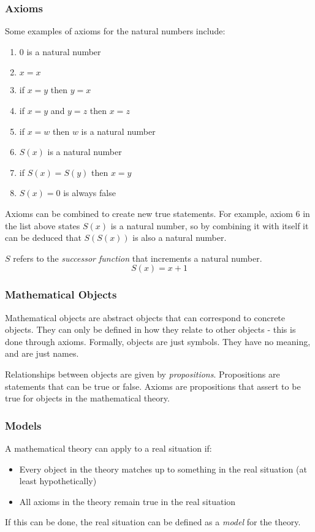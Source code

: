 \documentclass{article}
\begin{document}
\subsubsection{Axioms}
Some examples of axioms for the natural numbers include:
\begin{enumerate}
    \item 0 is a natural number
    \item \(x = x\)
    \item if \(x = y\) then \(y = x\)
    \item if \(x = y\) and \(y = z\) then \(x = z\)
    \item if \(x = w\) then \(w\) is a natural number
    \item \(S(x)\) is a natural number
    \item if \(S(x) = S(y)\) then \(x = y\)
    \item \(S(x) = 0\) is always false
\end{enumerate}
Axioms can be combined to create new true statements.
For example, axiom 6 in the list above states \(S(x)\) is a natural number,
so by combining it with itself it can be deduced that \(S(S(x))\) is also a natural number.
\begin{notebox}
    \begin{center}
        \(S\) refers to the \emph{successor function} that increments a natural number.
        \[S(x) = x + 1\]
    \end{center}
\end{notebox}
%
\subsubsection{Mathematical Objects}
Mathematical objects are abstract objects that can correspond to concrete objects.
They can only be defined in how they relate to other objects - this is done through axioms.
Formally, objects are just symbols. They have no meaning, and are just names.

Relationships between objects are given by \emph{propositions}.
Propositions are statements that can be true or false.
Axioms are propositions that assert to be true for objects in the mathematical theory.
%
\subsubsection{Models}
A mathematical theory can apply to a real situation if:
\begin{itemize}
    \item Every object in the theory matches up to something in the real situation (at least hypothetically)
    \item All axioms in the theory remain true in the real situation
\end{itemize}
If this can be done, the real situation can be defined as a \emph{model} for the theory.
\end{document}
